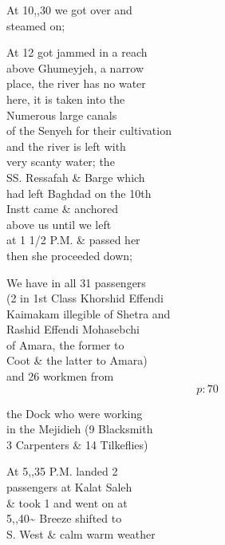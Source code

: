 \documentclass{report}
\begin{document}
	\par{
 	At 10,,30 we got over and\ \\steamed on;\ \\
	}

	\par{
 	At 12 got jammed in a reach\ \\above Ghumeyjeh, a narrow\ \\place, the river has no water\ \\here, it is taken into the\ \\Numerous large canals\ \\of the Senyeh for their cultivation\ \\and the river is left with\ \\very scanty water; the\ \\SS. Ressafah \& Barge which\ \\had left Baghdad on the 10th\ \\Instt came \& anchored\ \\above us until we left\ \\at 1 1/2 P.M. \& passed her\ \\then she proceeded down;\ \\
	}

	\par{
 	We have in all 31 passengers\ \\(2 in 1st Class Khorshid Effendi\ \\Kaimakam illegible of Shetra and\ \\Rashid Effendi Mohasebchi\ \\of Amara, the former to\ \\Coot \& the latter to Amara)\ \\and 26 workmen from\ \\
  \[p: 70 \]

	}

	\par{
 	the Dock who were working\ \\in the Mejidieh (9 Blacksmith\ \\3 Carpenters \& 14 Tilkeflies)\ \\
	}

	\par{
 	At 5,,35 P.M. landed 2\ \\passengers at Kalat Saleh\ \\\& took 1 and went on at\ \\5,,40\~{} Breeze shifted to\ \\S. West \& calm warm weather\ \\
	}
\end{document}
